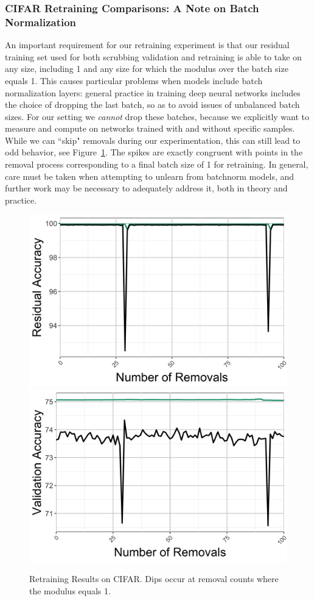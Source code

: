 \subsubsection{CIFAR Retraining Comparisons: A Note on Batch Normalization}
An important requirement for our retraining experiment is that our residual training set used for both scrubbing validation and retraining is able to take on any size, including 1 and any size for which the modulus over the batch size equals 1. This causes particular problems when models include batch normalization layers: general practice in training deep neural networks includes the choice of dropping the last batch, so as to avoid issues of unbalanced batch sizes. For our setting we \textit{cannot} drop these batches, because we explicitly want to measure and compute on networks trained with and without specific samples. While we can ``skip" removals during our experimentation, this can still lead to odd behavior, see Figure~\ref{fig:cifarretrain}. The spikes are exactly congruent with points in the removal process corresponding to a final batch size of 1 for retraining. In general, care must be taken when attempting to unlearn from batchnorm models, and further work may be necessary to adequately address it, both in theory and practice.
\begin{figure}
    \centering
    \includegraphics[width=0.495\columnwidth]{5_unlearn/figs/retrain/CIFAR_Retrain_Residual_Accs.png}
    \includegraphics[width=0.495\columnwidth]{5_unlearn/figs/retrain/CIFAR_Retrain_Validation_Accs.png}
    \caption[CIFAR retraining results]{Retraining Results on CIFAR. Dips occur at removal counts where the modulus equals 1.}
    \label{fig:cifarretrain}
\end{figure}

